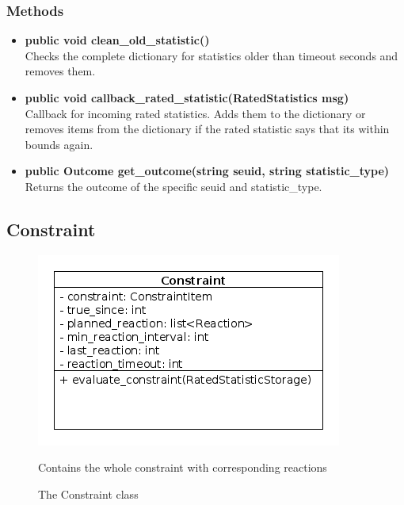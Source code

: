 \subsubsection{Methods}
\begin{itemize}
	\item \textbf{ public void clean\_old\_statistic() }\\
		Checks the complete dictionary for statistics older than timeout seconds and removes them.
	\item \textbf{ public void callback\_rated\_statistic(RatedStatistics msg) }\\
		Callback for incoming rated statistics. Adds them to the dictionary or removes items from the dictionary if the rated statistic says that its within bounds again. 
	\item \textbf{ public Outcome get\_outcome(string seuid, string statistic\_type) }\\
		Returns the outcome of the specific seuid and statistic\_type.
\end{itemize}

\newpage
\subsection{Constraint}
\begin{figure}[htbp]
	\begin{minipage}[t]{8cm}
		\vspace{0pt}
		\centering
		\includegraphics[scale=0.6]{./diagram_pictures/reactor/Constraint.png}
		\caption{The Constraint class}
	\end{minipage}
	\hfill
	\begin{minipage}[t]{8cm}
		\vspace{10pt}
			Contains the whole constraint with corresponding reactions
	\end{minipage}
\end{figure}  


